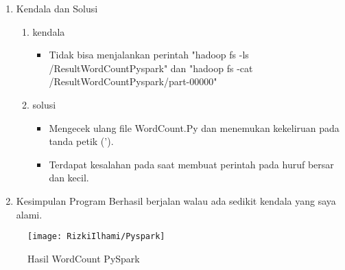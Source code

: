 \clearpage
{}
\begin{enumerate}
\item Kendala dan Solusi

\begin{enumerate}
    \item kendala
\begin{itemize}
    \item Tidak bisa menjalankan perintah 
    {\color{red}"hadoop fs -ls /ResultWordCountPyspark"} dan 
    {\color{red}"hadoop fs -cat /ResultWordCountPyspark/part-00000"}
\end{itemize}
    \item solusi
\begin{itemize}
    \item Mengecek ulang file {\color{red}WordCount.Py} dan menemukan kekeliruan pada tanda petik (').
    \item Terdapat kesalahan pada saat membuat perintah pada huruf bersar dan kecil.
\end{itemize}
\end{enumerate}

\item Kesimpulan
\newline Program Berhasil berjalan walau ada sedikit kendala yang saya alami.

\end{enumerate}

\begin{figure}[!ht]
    \texttt{[image: RizkiIlhami/Pyspark]}
    \caption{Hasil WordCount PySpark }
    \label{gam:hasil WordCountPyspark}
\end{figure}


